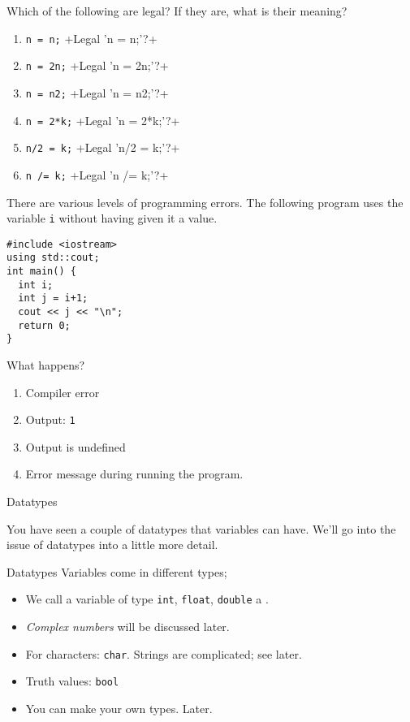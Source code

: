 \begin{exercise}
  \label{q:assign}
  Which of the following are legal? If they are, what is their meaning?
  \begin{enumerate}
  \item \lstinline{n = n;}
    \slackpollTF+Legal 'n = n;'?+
  \item \lstinline{n = 2n;}
    \slackpollTF+Legal 'n = 2n;'?+
  \item \lstinline{n = n2;}
    \slackpollTF+Legal 'n = n2;'?+
  \item \lstinline{n = 2*k;}
    \slackpollTF+Legal 'n = 2*k;'?+
  \item \lstinline{n/2 = k;}
    \slackpollTF+Legal 'n/2 = k;'?+
  \item \lstinline{n /= k;}
    \slackpollTF+Legal 'n /= k;'?+
  \end{enumerate}
\end{exercise}

There are various levels of programming errors.
The following program uses the variable \lstinline{i}
without having given it a value.

\begin{exercise}
  \label{q:initvar}
\begin{lstlisting}
#include <iostream>
using std::cout;
int main() {
  int i;
  int j = i+1;
  cout << j << "\n";
  return 0;
}
\end{lstlisting}
What happens?
\begin{enumerate}
\item Compiler error
\item Output: \lstinline{1}
\item Output is undefined
\item Error message during running the program.
\end{enumerate}
\end{exercise}

 {Datatypes}
\label{sec:ctypes}

You have seen a couple of datatypes that variables can have.
We'll go into the issue of datatypes into a little more detail.

\begin{block}{Datatypes}
  \label{sl:datatypes}
  Variables come in different types;
  \begin{itemize}
  \item We call a variable of type
    \lstinline{int}, \lstinline{float}, \lstinline{double} a .
  \item \emph{Complex numbers} will be
    discussed later.
  \item 
    For characters: \lstinline{char}. Strings are complicated; see later.
  \item Truth values: \lstinline{bool}
  \item 
    You can make your own types. Later.
  \end{itemize}
\end{block}

